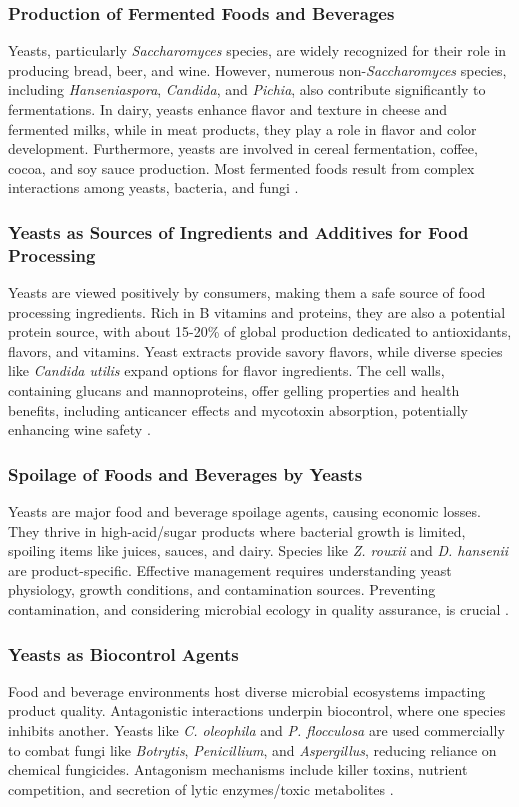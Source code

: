\subsubsection*{Production of Fermented Foods and Beverages}
Yeasts, particularly \textit{Saccharomyces} species, are widely recognized for their role in producing bread, beer, and wine. However, numerous non-\textit{Saccharomyces} species, including \textit{Hanseniaspora}, \textit{Candida}, and \textit{Pichia}, also contribute significantly to fermentations. In dairy, yeasts enhance flavor and texture in cheese and fermented milks, while in meat products, they play a role in flavor and color development. Furthermore, yeasts are involved in cereal fermentation, coffee, cocoa, and soy sauce production. Most fermented foods result from complex interactions among yeasts, bacteria, and fungi \cite*{L6-Yeasts}.

\subsubsection*{Yeasts as Sources of Ingredients and Additives for Food Processing}
Yeasts are viewed positively by consumers, making them a safe source of food processing ingredients. Rich in B vitamins and proteins, they are also a potential protein source, with about 15-20\% of global production dedicated to antioxidants, flavors, and vitamins. Yeast extracts provide savory flavors, while diverse species like \textit{Candida utilis} expand options for flavor ingredients. The cell walls, containing glucans and mannoproteins, offer gelling properties and health benefits, including anticancer effects and mycotoxin absorption, potentially enhancing wine safety \cite*{L6-Yeasts}.

\subsubsection*{Spoilage of Foods and Beverages by Yeasts}
Yeasts are major food and beverage spoilage agents, causing economic losses. They thrive in high-acid/sugar products where bacterial growth is limited, spoiling items like juices, sauces, and dairy. Species like \textit{Z. rouxii} and \textit{D. hansenii} are product-specific. Effective management requires understanding yeast physiology, growth conditions, and contamination sources. Preventing contamination, and considering microbial ecology in quality assurance, is crucial \cite*{L6-Yeasts}.

\subsubsection*{Yeasts as Biocontrol Agents}
Food and beverage environments host diverse microbial ecosystems impacting product quality. Antagonistic interactions underpin biocontrol, where one species inhibits another. Yeasts like \textit{C. oleophila} and \textit{P. flocculosa} are used commercially to combat fungi like \textit{Botrytis}, \textit{Penicillium}, and \textit{Aspergillus}, reducing reliance on chemical fungicides. Antagonism mechanisms include killer toxins, nutrient competition, and secretion of lytic enzymes/toxic metabolites \Cite{L6-Yeasts}.

